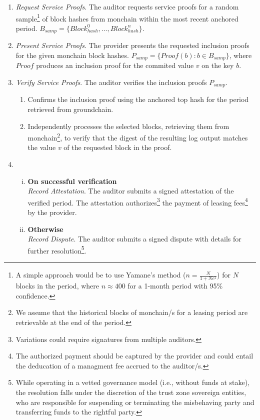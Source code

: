 \documentclass{oc}
\begin{document}
\begin{enumerate}
  \item \emph{Request Service Proofs}. The \gls{auditor} requests service proofs for a random sample\footnote{
    A simple approach would be to use Yamane's method ($n=\frac{N}{1+Ne^2}$) for $N$ blocks in the period, where $n\approx400$ for a 1-month period with 95\% confidence.
  } of block hashes from \gls{monchain} within the most recent anchored period. $B_{samp}=\{Block_{hash}^0,\ldots,Block_{hash}^n\}$.
  
  \item \emph{Present Service Proofs}. The \gls{provider} presents the requested inclusion proofs for the given \gls{monchain} block hashes. $P_{samp}=\{Proof(b) : b \in B_{samp}\}$,
  where $Proof$ produces an inclusion proof for the commited value $v$ on the key $b$.
  
  \item \emph{Verify Service Proofs}. The \gls{auditor} verifies the inclusion proofs $P_{samp}$.
    \begin{enumerate}
      \item Confirms the inclusion proof using the anchored top hash for the period retrieved from \gls{groundchain}.
      \item Independently processes the selected blocks, retrieving them from \gls{monchain}\footnote{
        We assume that the historical blocks of \gls*{monchain}/s for a leasing period are retrievable at the end of the period.
      }, to verify that the digest of the resulting log output matches the value $v$ of the requested block in the proof.
    \end{enumerate}
  \item
    \begin{enumerate}[(i)]
      \item \textbf{On successful verification} \\
      \emph{Record Attestation}. The \gls{auditor} submits a signed attestation of the verified period. The attestation authorizes\footnote{
        Variations could require signatures from multiple auditors.
      } the payment of leasing fees\footnote{
        The authorized payment should be captured by the \gls{provider} and could entail the deducation of a managment fee accrued to the \gls{auditor}/s.
      } by the \gls{provider}.
      \item \textbf{Otherwise} \\
      \emph{Record Dispute}. The \gls{auditor} submits a signed dispute with details for further resolution\footnote{
        While operating in a vetted governance model (i.e., without funds at stake),
        the resolution falls under the discretion of the trust zone sovereign entities,
        who are responsible for suspending or terminating the misbehaving party and transferring funds to the rightful party.
      }.
    \end{enumerate}

\end{enumerate}
\end{document}
